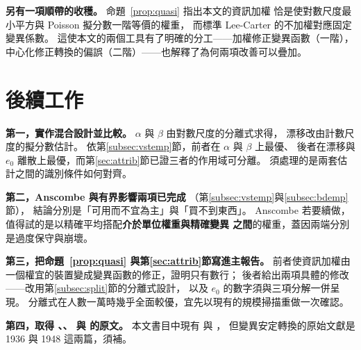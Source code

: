 \documentclass[UTF8, fontset=macnew, a4paper, 12pt]{ctexart}
\begin{document}
\textbf{另有一項順帶的收穫。} 命題~\ref{prop:quasi} 指出本文的資訊加權
恰是使對數尺度最小平方與 Poisson 擬分數一階等價的權重，
而標準 Lee-Carter 的不加權對應固定變異係數。
這使本文的兩個工具有了明確的分工——加權修正變異函數（一階），
中心化修正轉換的偏誤（二階）——也解釋了為何兩項改善可以疊加。

\section{後續工作}\label{sec:next}

\textbf{第一，實作混合設計並比較。}
$\alpha$ 與 $\beta$ 由對數尺度的分離式求得，
漂移改由計數尺度的擬分數估計。
依第\ref{subsec:vstemp}節，前者在 $\alpha$ 與 $\beta$ 上最優、
後者在漂移與 $e_0$ 離散上最優，而第\ref{sec:attrib}節已證三者的作用域可分離。
須處理的是兩套估計之間的識別條件如何對齊。

\textbf{第二，Anscombe 與有界影響兩項已完成}
（第\ref{subsec:vstemp}與\ref{subsec:bdemp}節），
結論分別是「可用而不宜為主」與「買不到東西」。
Anscombe 若要續做，值得試的是以精確平均搭配\textbf{介於單位權重與精確變異
之間}的權重，蓋因兩端分別是過度保守與崩壞。

\textbf{第三，把命題~\ref{prop:quasi} 與第\ref{sec:attrib}節寫進主報告。}
前者使資訊加權由一個權宜的裝置變成變異函數的修正，證明只有數行；
後者給出兩項具體的修改——改用第\ref{subsec:split}節的分離式設計，
以及 $e_0$ 的數字須與三項分解一併呈現。
分離式在人數一萬時幾乎全面較優，宜先以現有的規模掃描重做一次確認。

\textbf{第四，取得 \citet{anscombe1948}、\citet{bartlett1936}、
\citet{freeman1950} 與 \citet{cantoni2001} 的原文。}
本文書目中現有 \citet{anscombe1956} 與 \citet{bartlett1937,bartlett1953}，
但變異安定轉換的原始文獻是 1936 與 1948 這兩篇，須補。

\clearpage


\end{document}

